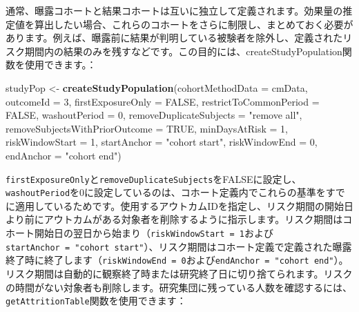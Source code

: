\documentclass[
  11pt]{book}
\newenvironment{Shaded}{\begin{snugshade}}{\end{snugshade}}
\newcommand{\AttributeTok}[1]{\textcolor[rgb]{0.13,0.29,0.53}{#1}}
\newcommand{\ConstantTok}[1]{\textcolor[rgb]{0.56,0.35,0.01}{#1}}
\newcommand{\DecValTok}[1]{\textcolor[rgb]{0.00,0.00,0.81}{#1}}
\newcommand{\FunctionTok}[1]{\textcolor[rgb]{0.13,0.29,0.53}{\textbf{#1}}}
\newcommand{\NormalTok}[1]{#1}
\newcommand{\OtherTok}[1]{\textcolor[rgb]{0.56,0.35,0.01}{#1}}
\newcommand{\StringTok}[1]{\textcolor[rgb]{0.31,0.60,0.02}{#1}}
\theoremstyle{definition}
\theoremstyle{definition}
\theoremstyle{definition}
\theoremstyle{definition}
\theoremstyle{remark}
\begin{document}
通常、曝露コホートと結果コホートは互いに独立して定義されます。効果量の推定値を算出したい場合、これらのコホートをさらに制限し、まとめておく必要があります。例えば、曝露前に結果が判明している被験者を除外し、定義されたリスク期間内の結果のみを残すなどです。この目的には、createStudyPopulation関数を使用できます。：

\begin{Shaded}
\begin{Highlighting}[]
\NormalTok{studyPop }\OtherTok{\textless{}{-}} \FunctionTok{createStudyPopulation}\NormalTok{(}\AttributeTok{cohortMethodData =}\NormalTok{ cmData,}
                                  \AttributeTok{outcomeId =} \DecValTok{3}\NormalTok{,}
                                  \AttributeTok{firstExposureOnly =} \ConstantTok{FALSE}\NormalTok{,}
                                  \AttributeTok{restrictToCommonPeriod =} \ConstantTok{FALSE}\NormalTok{,}
                                  \AttributeTok{washoutPeriod =} \DecValTok{0}\NormalTok{,}
                                  \AttributeTok{removeDuplicateSubjects =} \StringTok{"remove all"}\NormalTok{,}
                                  \AttributeTok{removeSubjectsWithPriorOutcome =} \ConstantTok{TRUE}\NormalTok{,}
                                  \AttributeTok{minDaysAtRisk =} \DecValTok{1}\NormalTok{,}
                                  \AttributeTok{riskWindowStart =} \DecValTok{1}\NormalTok{,}
                                  \AttributeTok{startAnchor =} \StringTok{"cohort start"}\NormalTok{,}
                                  \AttributeTok{riskWindowEnd =} \DecValTok{0}\NormalTok{,}
                                  \AttributeTok{endAnchor =} \StringTok{"cohort end"}\NormalTok{)}
\end{Highlighting}
\end{Shaded}

\texttt{firstExposureOnly}と\texttt{removeDuplicateSubjects}をFALSEに設定し、\texttt{washoutPeriod}を0に設定しているのは、コホート定義内でこれらの基準をすでに適用しているためです。使用するアウトカムIDを指定し、リスク期間の開始日より前にアウトカムがある対象者を削除するように指示します。リスク期間はコホート開始日の翌日から始まり（\texttt{riskWindowStart\ =\ 1}および\texttt{startAnchor\ =\ "cohort\ start"}）、リスク期間はコホート定義で定義された曝露終了時に終了します（\texttt{riskWindowEnd\ =\ 0}および\texttt{endAnchor\ =\ "cohort\ end"}）。リスク期間は自動的に観察終了時または研究終了日に切り捨てられます。リスクの時間がない対象者も削除します。研究集団に残っている人数を確認するには、\texttt{getAttritionTable}関数を使用できます：
\end{document}
